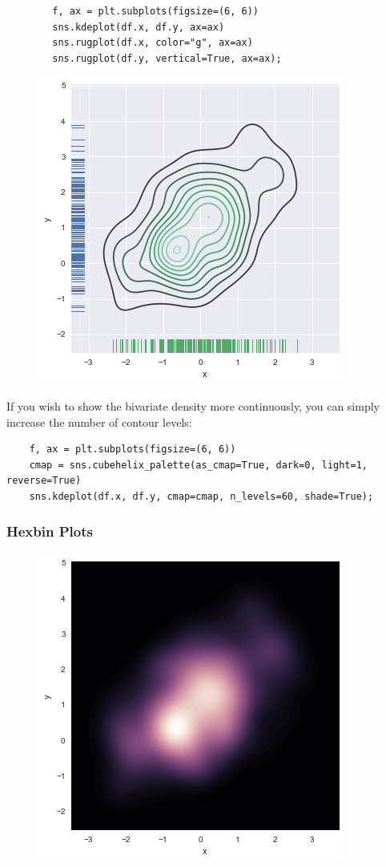 \documentclass{beamer}
\begin{document}
\begin{frame}[fragile]
	\begin{framed}
		\begin{verbatim}
		f, ax = plt.subplots(figsize=(6, 6))
		sns.kdeplot(df.x, df.y, ax=ax)
		sns.rugplot(df.x, color="g", ax=ax)
		sns.rugplot(df.y, vertical=True, ax=ax);
		\end{verbatim}
	\end{framed}
	\begin{figure}
		\centering
		\includegraphics[width=0.55\linewidth]{images/distributions_36_0}
	\end{figure}
	
\end{frame}
\begin{frame}[fragile]
	\large
	If you wish to show the bivariate density more continuously, you can simply increase the number of contour levels:
	\begin{verbatim}
	f, ax = plt.subplots(figsize=(6, 6))
	cmap = sns.cubehelix_palette(as_cmap=True, dark=0, light=1, reverse=True)
	sns.kdeplot(df.x, df.y, cmap=cmap, n_levels=60, shade=True);
	\end{verbatim}
\end{frame}
\begin{frame}[fragile]
	\frametitle{Hexbin Plots}
	\large
	\begin{figure}
		\centering
		\includegraphics[width=0.55\linewidth]{images/distributions_38_0}
	\end{figure}
	
	
\end{frame}
\end{document}
